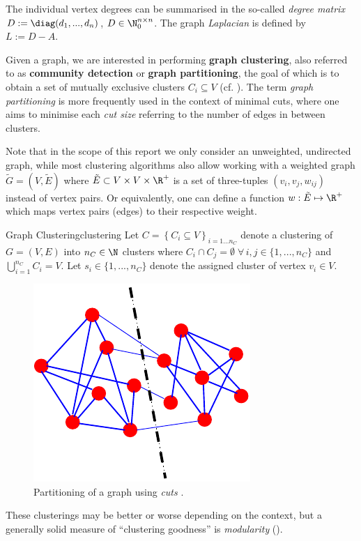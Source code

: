 \documentclass{prettytex/ox/mmsc-special-topic}
\begin{document}
  The individual vertex degrees can be summarised in the so-called \textit{degree matrix} $D := \diag(d_1, ..., d_n)$, $D \in \N_0^{n \times n}$. The graph \textit{Laplacian} is defined by $L := D - A$.

  Given a graph, we are interested in performing \textbf{graph clustering}, also referred to as \textbf{community detection} or \textbf{graph partitioning}, the goal of which is to obtain a set of mutually exclusive clusters $C_i \subseteq V$ (cf. ).
  The term \textit{graph partitioning} is more frequently used in the context of minimal cuts, where one aims to minimise each \textit{cut size} referring to the number of edges in between clusters.

  Note that in the scope of this report we only consider an unweighted, undirected graph, while most clustering algorithms also allow working with a weighted graph $\tilde{G} = (V, \tilde{E})$ where $\tilde{E} \subset V \times V \times \R^+$ is a set of three-tuples $(v_i, v_j, w_{ij})$ instead of vertex pairs. Or equivalently, one can define a function $w: \tilde{E} \mapsto \R^+$ which maps vertex pairs (edges) to their respective weight.

  \begin{definition}{Graph Clustering}{clustering}
    Let $C = \left\{C_i \subseteq V \right\}_{i=1 ... n_C}$ denote a clustering of $G = (V, E)$ into $n_C \in \N$ clusters where $C_i \cap C_j = \emptyset \; \forall\,i, j \in \{1, ..., n_C\}$ and $\bigcup_{i=1}^{n_C} C_i = V$. Let $s_i \in \{1, ..., n_C\}$ denote the assigned cluster of vertex $v_i \in V$.
  \end{definition}

  \begin{figure}[h]
    \centering
    \includegraphics[width=0.3\linewidth]{figures/graphpartitioning.pdf}
    \caption{Partitioning of a graph using \textit{cuts} \parencite{fortunato-2009}.}
  \end{figure}

  These clusterings may be better or worse depending on the context, but a generally solid measure of ``clustering goodness'' is \textit{modularity} ().
\end{document}
